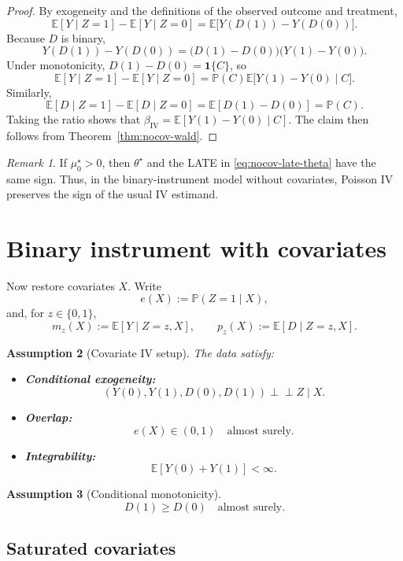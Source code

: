 \documentclass[11pt]{article}
\numberwithin{equation}{section}
\newcommand{\E}{\mathbb E}
\newcommand{\PP}{\mathbb P}
\newcommand{\1}{\mathbf 1}
\newcommand{\indep}{\perp\!\!\!\perp}
\newtheorem{assumption}{Assumption}[section]
\theoremstyle{remark}
\newtheorem{remark}[assumption]{Remark}
\begin{document}
\begin{proof}
By exogeneity and the definitions of the observed outcome and treatment,
\[
\E[Y\mid Z=1]-\E[Y\mid Z=0]
= \E\bigl[Y(D(1))-Y(D(0))\bigr].
\]
Because $D$ is binary,
\[
Y(D(1))-Y(D(0)) = \bigl(D(1)-D(0)\bigr)\bigl(Y(1)-Y(0)\bigr).
\]
Under monotonicity, $D(1)-D(0)=\1\{C\}$, so
\[
\E[Y\mid Z=1]-\E[Y\mid Z=0]
= \PP(C)\E\bigl[Y(1)-Y(0)\mid C\bigr].
\]
Similarly,
\[
\E[D\mid Z=1]-\E[D\mid Z=0]
= \E[D(1)-D(0)] = \PP(C).
\]
Taking the ratio shows that $\beta_{\mathrm{IV}}=\E[Y(1)-Y(0)\mid C]$. The claim then
follows from Theorem~\ref{thm:nocov-wald}.
\end{proof}

\begin{remark}\label{rem:nocov-sign}
If $\mu_0^\star>0$, then $\theta^\star$ and the LATE in
\eqref{eq:nocov-late-theta} have the same sign. Thus, in the binary-instrument model
without covariates, Poisson IV preserves the sign of the usual IV estimand.
\end{remark}

\section{Binary instrument with covariates}

Now restore covariates $X$. Write
\[
e(X) := \PP(Z=1\mid X),
\]
and, for $z\in\{0,1\}$,
\[
m_z(X) := \E[Y\mid Z=z,X], \qquad p_z(X) := \E[D\mid Z=z,X].
\]

\begin{assumption}[Covariate IV setup]\label{ass:cov}
The data satisfy:
\begin{itemize}
    \item[(i)] \textbf{Conditional exogeneity:}
    \[
    (Y(0),Y(1),D(0),D(1)) \indep Z \mid X.
    \]
    \item[(ii)] \textbf{Overlap:}
    \[
    e(X) \in (0,1) \quad \text{almost surely.}
    \]
    \item[(iii)] \textbf{Integrability:}
    \[
    \E[Y(0)+Y(1)] < \infty.
    \]
\end{itemize}
\end{assumption}

\begin{assumption}[Conditional monotonicity]\label{ass:mono-cov}
\[
D(1) \ge D(0) \quad \text{almost surely.}
\]
\end{assumption}

\subsection{Saturated covariates}
\end{document}
